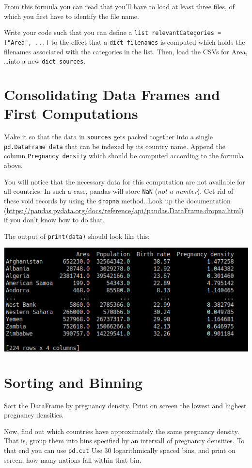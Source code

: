 \documentclass[
	english,
	fontsize=10pt,
	parskip=half,
	titlepage=true,
	DIV=12
]{scrartcl}
\newcommand*{\inPy}[1]{\texttt{#1}}
\begin{document}
From this formula you can read that you'll have to load at least three files, of which you first have to identify the file name.

Write your code such that you can define a \inPy{list relevantCategories = ["Area", ...]} to the effect that a \inPy{dict filenames} is computed which holds the filenames associated with the categories in the list. Then, load the CSVs for Area, \ldots into a new \inPy{dict sources}.

\section{Consolidating Data Frames and First Computations}
Make it so that the data in \texttt{sources} gets packed together into a single \texttt{pd.DataFrame data} that can be indexed by its country name. Append the column \texttt{Pregnancy density} which should be computed according to the formula above.

You will notice that the necessary data for this computation are not available for all countries. In such a case, pandas will store \texttt{NaN} (\emph{not a number}). Get rid of these void records by using the \texttt{dropna} method. Look up the documentation (\url{https://pandas.pydata.org/docs/reference/api/pandas.DataFrame.dropna.html}) if you don't know how to do that.

The output of \inPy{print(data)} should look like this:
\begin{center}
	\includegraphics[width=.6\linewidth]{./DataFrame-Minimal}
\end{center}

\section{Sorting and Binning}
Sort the DataFrame by pregnancy density. Print on screen the lowest and highest pregnancy densities.

Now, find out which countries have approximately the same pregnancy density. That is, group them into bins specified by an intervall of pregnancy densities. To that end you can use \texttt{pd.cut} Use 30 logarithmically spaced bins, and print on screen, how many nations fall within that bin.
\end{document}
